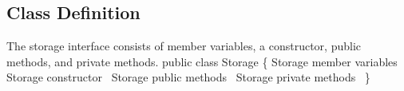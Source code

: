 \documentclass{article}
\def\nwendcode{\endtrivlist \endgroup}      %
\let\nwdocspar=\par
\theoremstyle{definition}                   %
\begin{document}
\subsection{Class Definition}
\label{sec:class-definition}
The storage interface consists of member variables, a constructor, public
methods, and private methods.
\nwenddocs{}\endmoddef{}
public class Storage \{
  \LA{}\code{}Storage\edoc{} member variables~{\nwtagstyle{}}\RA{}
  \LA{}\code{}Storage\edoc{} constructor~{\nwtagstyle{}}\RA{}
  \LA{}\code{}Storage\edoc{} public methods~{\nwtagstyle{}}\RA{}
  \LA{}\code{}Storage\edoc{} private methods~{\nwtagstyle{}}\RA{}
\}
\nwendcode{}\nwdocspar
\end{document}
